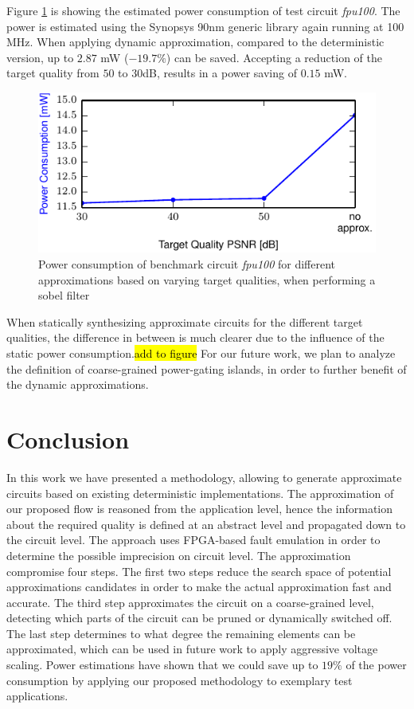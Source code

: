 \documentclass[conference]{IEEEtran}
\begin{document}
Figure \ref{fig:power_fpu} is showing the estimated power consumption of test circuit \emph{fpu100}. The power is estimated using the Synopsys 90nm generic library again running at 100 MHz. When applying dynamic approximation, compared to the deterministic version, up to $2.87$ mW ($-19.7\%$) can be saved. Accepting a reduction of the target quality from $50$ to $30$dB, results in a power saving of $0.15$ mW.
\begin{figure}[htb]
  \centering
  \includegraphics[width=.5\textwidth]{figs/power_fpu}
  \caption{Power consumption of benchmark circuit \emph{fpu100} for different approximations based on varying target qualities, when performing a sobel filter}
  \label{fig:power_fpu}
\end{figure}
When statically synthesizing approximate circuits for the different target qualities, the difference in between is much clearer due to the influence of the static power consumption.\hl{add to figure} For our future work, we plan to analyze the definition of coarse-grained power-gating islands, in order to further benefit of the dynamic approximations.


\section{Conclusion}
\label{sec:conclusion}
In this work we have presented a methodology, allowing to generate approximate circuits based on existing deterministic implementations. The approximation of our proposed flow is reasoned from the application level, hence the information about the required quality is defined at an abstract level and propagated down to the circuit level. The approach uses FPGA-based fault emulation in order to determine the possible imprecision on circuit level. The approximation compromise four steps. The first two steps reduce the search space of potential approximations candidates in order to make the actual approximation fast and accurate. The third step approximates the circuit on a coarse-grained level, detecting which parts of the circuit can be pruned or dynamically switched off. The last step determines to what degree the remaining elements can be approximated, which can be used in future work to apply aggressive voltage scaling. Power estimations have shown that we could save up to $19\%$ of the power consumption by applying our proposed methodology to exemplary test applications.
\end{document}

